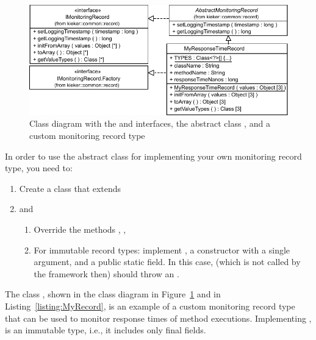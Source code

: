 \begin{figure}[ht]\centering
\includegraphics[scale=0.75]{images/kieker_MyRTRecord-modified}
\caption{Class diagram with the  and  interfaces, the abstract %
class , and a custom monitoring record type %
}
\label{sec:monitoringrecord:interfacesAndImplementingClasses}
\end{figure}

 \pagebreak

\noindent In order to use the abstract class for implementing your own monitoring record type, you need to:

\begin{enumerate}
\item Create a class that extends 
\item  and
\begin{enumerate}
\item Override the methods , , 
\item For immutable record types: implement , a constructor %
with a single  argument, and a public static  field. %
In this case,  (which is not called by the framework then) should %
throw an .
\end{enumerate}
\end{enumerate}

\noindent The class , shown in the class diagram in %
Figure~\ref{sec:monitoringrecord:interfacesAndImplementingClasses} and in %
Listing~\ref{listing:MyRecord}, is an example of a custom monitoring record type %
that can be used to monitor response times of method executions. %
Implementing ,  is %
an immutable type, i.e., it includes only final fields. %

